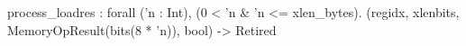process_loadres : forall ('n : Int), (0 < 'n & 'n <= xlen_bytes).
  (regidx, xlenbits, MemoryOpResult(bits(8 * 'n)), bool) -> Retired